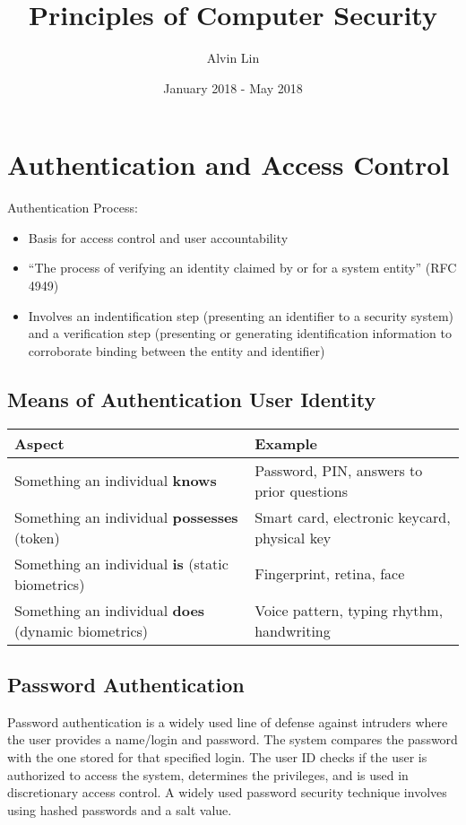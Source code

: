 \documentclass{math}
\title{Principles of Computer Security}
\author{Alvin Lin}
\date{January 2018 - May 2018}
\begin{document}
\maketitle

\section*{Authentication and Access Control}
Authentication Process:
\begin{itemize}
  \item Basis for access control and user accountability
  \item ``The process of verifying an identity claimed by or for a system
  entity'' (RFC 4949)
  \item Involves an indentification step (presenting an identifier to a
  security system) and a verification step (presenting or generating
  identification information to corroborate binding between the entity and
  identifier)
\end{itemize}

\subsection*{Means of Authentication User Identity}
\begin{tabular}{|p{5cm}|p{8cm}|}
  \hline
  Aspect & Example \\
  \hline
  Something an individual \textbf{knows} & Password, PIN, answers to prior
    questions \\
  \hline
  Something an individual \textbf{possesses} (token) & Smart card, electronic
    keycard, physical key \\
  \hline
  Something an individual \textbf{is} (static biometrics) & Fingerprint, retina,
    face \\
  \hline
  Something an individual \textbf{does} (dynamic biometrics) & Voice pattern,
    typing rhythm, handwriting \\
  \hline
\end{tabular}

\subsection*{Password Authentication}
Password authentication is a widely used line of defense against intruders where
the user provides a name/login and password. The system compares the password
with the one stored for that specified login. The user ID checks if the user is
authorized to access the system, determines the privileges, and is used in
discretionary access control. A widely used password security technique involves
using hashed passwords and a salt value.
\end{document}
